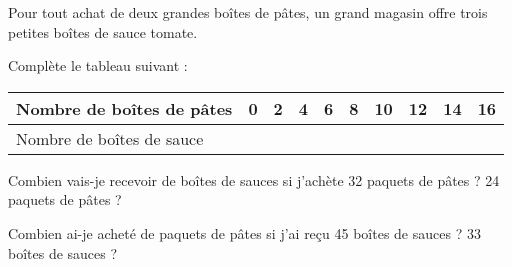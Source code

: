 Pour tout achat de deux grandes boîtes de pâtes, un grand magasin offre trois petites boîtes de sauce tomate.
\begin{myenumerate}
\item Complète le tableau suivant :
\begin{center}
  \begin{tabularx}{15cm}{|X|c|c|c|c|c|c|c|c|c|}
\hline
Nombre de boîtes de pâtes&0&2&4&6&8&10&12&14&16\\
\hline
Nombre de boîtes de sauce&&&&&&&&&\\
\hline    
  \end{tabularx}
\end{center}
\item Combien vais-je recevoir de boîtes de sauces si j'achète 32 paquets de pâtes ? 24 paquets de pâtes ?
\item Combien ai-je acheté de paquets de pâtes si j'ai reçu 45 boîtes de sauces ? 33 boîtes de sauces ?
\end{myenumerate}